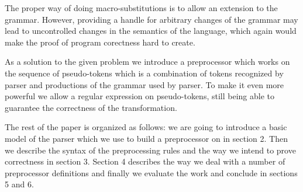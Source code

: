 The proper way of doing macro-substitutions is to allow an
extension to the grammar.  However, providing a handle for
arbitrary changes of the grammar may lead to uncontrolled 
changes in the semantics of the language, which again would
make the proof of program corectness hard to create.

As a solution to the given problem we introduce a preprocessor
which works on the sequence of pseudo-tokens which is a combination
of tokens recognized by parser and productions of the grammar
used by parser.  To make it even more powerful we allow a 
regular expression on pseudo-tokens, still being able to 
guarantee the correctness of the transformation.

The rest of the paper is organized as follows: we are going to 
introduce a basic model of the parser which we use to build a
preprocessor on in section 2.  Then we describe the syntax of
the preprocessing rules and the way we intend to prove correctness
in section 3.  Section 4 describes the way we deal with a number
of preprocessor definitions and finally we evaluate the work
and conclude in sections 5 and 6.


